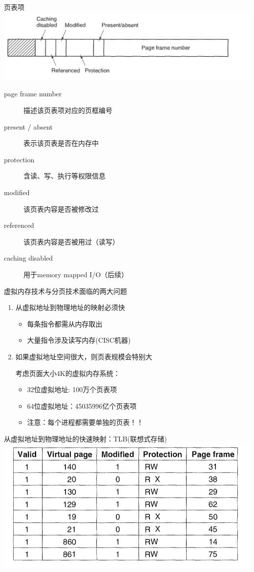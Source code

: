 \documentclass[xcolor=svgnames]{beamer}
\begin{document}
\begin{CJK*}{UTF8}{gbsn}
\begin{frame}{页表项}
\includegraphics[width=1.0\textwidth]{pte.png}
\begin{description}
\item[page frame number]描述该页表项对应的页框编号
\item[present / absent]表示该页表是否在内存中
\item[protection]含读、写、执行等权限信息
\item[modified]该页表内容是否被修改过
\item[referenced]该页表内容是否被用过（读写）
\item[caching disabled]用于memory mapped I/O（后续）
\end{description}
\end{frame}

\begin{frame}{虚拟内存技术与分页技术面临的两大问题}
\begin{enumerate}
\item 从虚拟地址到物理地址的映射必须快
\begin{itemize}
\item 每条指令都需从内存取出
\item 大量指令涉及读写内存(CISC机器)
\end{itemize}
\item 如果虚拟地址空间很大，则页表规模会特别大

考虑页面大小4K的虚拟内存系统：
\begin{itemize}
\item 32位虚拟地址: 100万个页表项
\item 64位虚拟地址：45035996亿个页表项
\item 注意：每个进程都需要单独的页表！！
\end{itemize}
\end{enumerate}
\end{frame}

\begin{frame}{从虚拟地址到物理地址的快速映射：TLB(联想式存储)}
\includegraphics[width=1.0\textwidth]{tlb.png}


\end{frame}
\end{CJK*}
\end{document}
